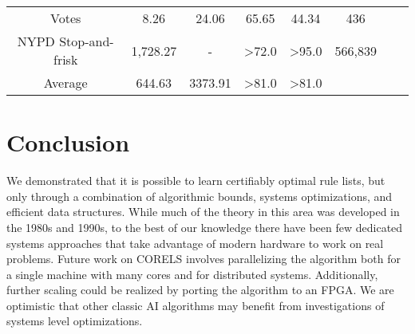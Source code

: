 \documentclass[format=sigconf]{acmart}
\begin{document}
\begin{table}[h]
{\begin{tabular}{|c|c|c|c|c|c|c|c|}
Votes  & 8.26 \color{blue}{[43.73 MB]}                                                          & 24.06 \color{blue}{[78.56 MB]}                                                                                                            & 65.65                                                     & 44.34 & 436 \\
NYPD Stop-and-frisk & 1,728.27 \color{blue}{[641 MB]} & - \color{blue}{[\textgreater12288 MB]} & \textgreater72.0 & \textgreater95.0 & 566,839 \\ \hline
Average & 644.63 \color{blue}{[955.85 MB]} & 3373.91 \color{blue}{[\textgreater 5267 MB]} & \textgreater81.0 & \textgreater81.0 & \\ \hline
\end{tabular}%
}
\end{table}


\section{Conclusion}
We demonstrated that it is possible to learn certifiably optimal rule lists, but only through a combination of algorithmic bounds, systems optimizations, and efficient data structures.
While much of the theory in this area was developed in the 1980s and 1990s, to the best of our knowledge there have been few dedicated systems approaches that take advantage of modern hardware to work on real problems.
Future work on CORELS involves parallelizing the algorithm both for a single machine with many cores and for distributed systems.
Additionally, further scaling could be realized by porting the algorithm to an FPGA.
We are optimistic that other classic AI algorithms may benefit from investigations of systems level optimizations.


%

\end{document}
